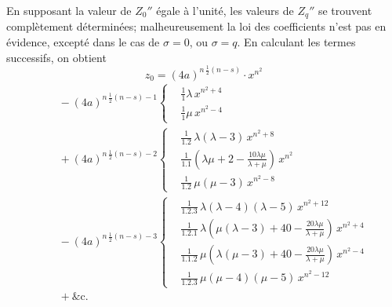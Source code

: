 \documentclass[11pt]{article}
\begin{document}
\medskip
En supposant la valeur de $Z_{0}''$ \'egale \`a l'unit\'e, les valeurs de $Z_{q}''$ se trouvent
compl\`etement d\'etermin\'ees; malheureusement la loi des coefficients n'est pas en \'evidence,
except\'e dans le cas de $\sigma = 0$, ou $\sigma = q$. En calculant les termes successifs, on obtient
\[
z_{0} = (4a)^{n\,\tfrac{1}{2}(n - s)}\cdot x^{n^{2}}
\]
\begin{align*}
&\quad - (4a)^{n\,\tfrac{1}{2}(n - s) - 1}\!\left\{\begin{aligned}
&\tfrac{1}{1}\lambda\,x^{n^{2} + 4}\\
&\tfrac{1}{1}\mu\,x^{n^{2} - 4}
\end{aligned}\right.\\
&\quad + (4a)^{n\,\tfrac{1}{2}(n - s) - 2}\!\left\{\begin{aligned}
&\tfrac{1}{1.2}\,\lambda(\lambda - 3)\,x^{n^{2} + 8}\\
&\tfrac{1}{1.1}\!\left(\lambda\mu + 2 - \tfrac{10\lambda\mu}{\lambda + \mu}\right)\,x^{n^{2}}\\
&\tfrac{1}{1.2}\,\mu(\mu - 3)\,x^{n^{2} - 8}
\end{aligned}\right.\\
&\quad - (4a)^{n\,\tfrac{1}{2}(n - s) - 3}\!\left\{\begin{aligned}
&\tfrac{1}{1.2.3}\,\lambda(\lambda - 4)(\lambda - 5)\,x^{n^{2} + 12}\\
&\tfrac{1}{1.2.1}\,\lambda\!\left(\mu(\lambda - 3) + 40 - \tfrac{20\lambda\mu}{\lambda + \mu}\right)\,x^{n^{2} + 4}\\
&\tfrac{1}{1.1.2}\,\mu\!\left(\lambda(\mu - 3) + 40 - \tfrac{20\lambda\mu}{\lambda + \mu}\right)\,x^{n^{2} - 4}\\
&\tfrac{1}{1.2.3}\,\mu(\mu - 4)(\mu - 5)\,x^{n^{2} - 12}
\end{aligned}\right.\\
&\quad + \&\text{c.}
\end{align*}
\end{document}
